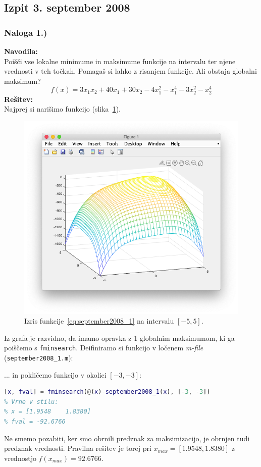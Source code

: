 \documentclass[a4paper,11pt]{article}
\begin{document}
\subsection{Izpit 3. september 2008}
\subsubsection{Naloga 1.)}

\textbf{Navodila:} \\ 
Poišči vse lokalne minimume in maksimume funkcije na intervalu ter njene vrednosti v teh točkah. Pomagaš si lahko z risanjem funkcije. Ali obstaja globalni maksimum?
\begin{equation} \label{eq:september2008_1}
	f(x) = 3x_1x_2 + 40x_1 + 30x_2 - 4x_1^2  - x_1^4 -3x_2^2 -x_2^4
\end{equation}
\textbf{Rešitev:} \\
Najprej si narišimo funkcijo (slika~\ref{img:september2008_1_plot}).

\begin{figure}[hbt]
	\centering
	\includegraphics[scale=.4]{images/september2008_1_plot.png}
	\caption{Izris funkcije~\ref{eq:september2008_1} na intervalu $[-5, 5]$.}
	\label{img:september2008_1_plot}
\end{figure}
Iz grafa je razvidno, da imamo opravka z 1 globalnim maksimumom, ki ga poiščemo s \texttt{fminsearch}. Deifiniramo si funkcijo v ločenem \textit{m-file} (\texttt{september2008\_1.m}):

... in pokličemo funkcijo v okolici $[-3, -3]$:
\begin{lstlisting}[language=Matlab]
[x, fval] = fminsearch(@(x)-september2008_1(x), [-3, -3])
% Vrne v stilu:
% x = [1.9548    1.8380]
% fval = -92.6766
\end{lstlisting}
Ne smemo pozabiti, ker smo obrnili predznak za maksimizacijo, je obrnjen tudi predznak vrednosti. Pravilna rešitev je torej pri $x_{max} = [1.9548, 1.8380]$ z vrednostjo $f(x_{max}) = 92.6766$.
\end{document}
